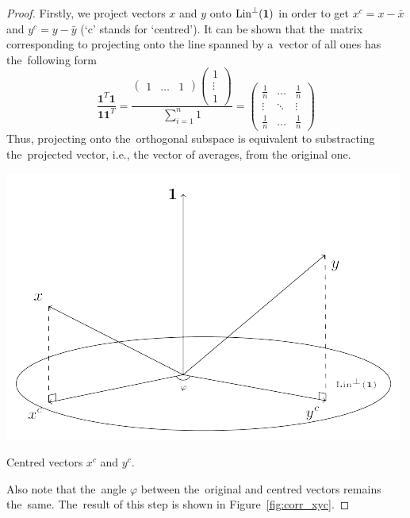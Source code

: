 \begin{proof}
Firstly, we project vectors $x$ and $y$ onto $\operatorname{Lin}^{\perp}(\mathbf{1})$
in order to get $x^c = x - \bar x$ and $y^c = y - \bar y$ (`c' stands for `centred').
It can be shown that the~matrix corresponding to projecting onto the line spanned by
a~vector of all ones has the~following form
\[
\frac{\mathbf{1}^T \mathbf{1}}{\mathbf{1} \mathbf{1}^T} = \frac{\begin{pmatrix} 1 & \ldots & 1 \end{pmatrix} \begin{pmatrix} 1 \\ \vdots \\ 1 \end{pmatrix}}{\sum_{i=1}^n 1} = \begin{pmatrix} \frac{1}{n} & \ldots & \frac{1}{n} \\ \vdots & \ddots & \vdots \\ \frac{1}{n} & \ldots & \frac{1}{n} \end{pmatrix}
\]
Thus, projecting onto the~orthogonal subspace is equivalent to
substracting the~projected vector, i.e., the vector of averages, from the original one.

\begin{marginfigure}
\includegraphics[scale=0.65]{figures/02_correlation_constant_centered_variables.pdf}
\caption{Centred vectors $x^c$ and $y^c$.}
\label{fig:corr_xyc}
\end{marginfigure}

Also note that the~angle $\varphi$ between the~original and centred vectors remains the~same.
The~result of this step is shown in Figure~\ref{fig:corr_xyc}.


\end{proof}
